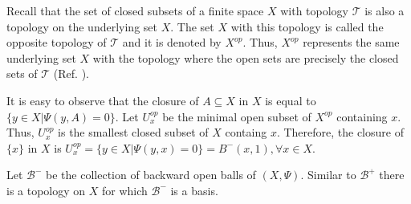 \documentclass[12pt]{amsart}
\newtheorem{lemma}[definition]{Lemma}
\newtheorem{remark}[definition]{Remark}
\begin{document}

Recall that the set of closed subsets of a finite space $X$ with topology $\mathcal{T}$ is also a topology on the underlying set $X$. The set $X$ with this topology is %
called the opposite topology of $\mathcal{T}$ and it is denoted by $X^{op}$. Thus, $X^{op}$ represents the same underlying set $X$ with the topology where the open sets are precisely the closed sets of $\mathcal{T}$ (Ref. \cite{Barmak}).\par 
It is easy to observe that the closure of $A\subseteq X$ in  $X$ is equal to $\{y\in X|\Psi(y,A)=0\}$. Let $U_x^{op}$ be the minimal open subset of $X^{op}$ containing $x$. Thus,  $U_x^{op}$ is the smallest closed subset of $X$ containg $x$. 
Therefore, the closure of $\{x\}$ in  $X$ is $U_x^{op}=%
\{y\in X|\Psi(y,x)=0\}=B^-(x,1),\forall x\in X$. %





Let $\mathcal{B}^-$ be the collection of backward open balls of $(X,\Psi)$.
Similar to $\mathcal{B}^+$ there is a topology on $X$ for which $\mathcal{B}^-$ is a basis. %
\end{document}
